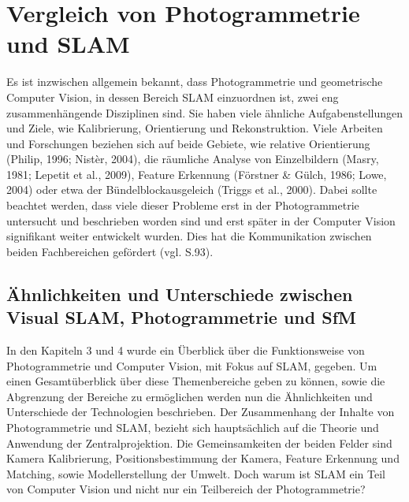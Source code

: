\chapter{Vergleich von Photogrammetrie und SLAM}

Es ist inzwischen allgemein bekannt, dass Photogrammetrie und geometrische Computer Vision, in dessen Bereich SLAM einzuordnen ist, zwei eng zusammenhängende Disziplinen sind. Sie haben viele ähnliche Aufgabenstellungen und Ziele, wie Kalibrierung, Orientierung und Rekonstruktion. Viele Arbeiten und Forschungen beziehen sich auf beide Gebiete, wie relative Orientierung (Philip, 1996; Nistèr, 2004), die räumliche Analyse von Einzelbildern (Masry, 1981; Lepetit et al., 2009), Feature Erkennung  (Förstner \& Gülch, 1986; Lowe, 2004) oder etwa der Bündelblockausgeleich  (Triggs et al., 2000). Dabei sollte beachtet werden, dass viele dieser Probleme erst in der Photogrammetrie untersucht und beschrieben worden sind und erst später in der Computer Vision signifikant weiter entwickelt wurden. Dies hat die Kommunikation zwischen beiden Fachbereichen gefördert (vgl. \cite{ph_vs_cv} S.93).


\section{Ähnlichkeiten und Unterschiede zwischen Visual SLAM, Photogrammetrie und SfM}

In den Kapiteln 3 und 4 wurde ein Überblick über die Funktionsweise von Photogrammetrie und Computer Vision, mit Fokus auf SLAM, gegeben. Um einen Gesamtüberblick über diese Themenbereiche geben zu können, sowie die Abgrenzung der Bereiche zu ermöglichen werden nun die Ähnlichkeiten und Unterschiede der Technologien beschrieben. Der Zusammenhang der Inhalte von Photogrammetrie und SLAM, bezieht sich hauptsächlich auf die Theorie und Anwendung der Zentralprojektion. Die Gemeinsamkeiten der beiden Felder sind Kamera Kalibrierung, Positionsbestimmung der Kamera, Feature Erkennung und Matching, sowie Modellerstellung der Umwelt. Doch warum ist SLAM ein Teil von Computer Vision und nicht nur ein Teilbereich der Photogrammetrie?

